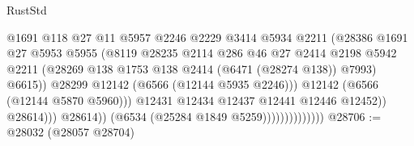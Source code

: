 \begin{lexlean}{RustStd}
\begin{coremodule}
                                              @1691
                                              @118
                                              @27
                                              @11
                                              @5957
                                              @2246
                                              @2229
                                              @3414
                                              @5934
                                              @2211
                                              (@28386
                                                @1691
                                                @27
                                                @5953
                                                @5955
                                                (@8119
                                                  @28235
                                                  @2114
                                                  @286
                                                  @46
                                                  @27
                                                  @2414
                                                  @2198
                                                  @5942
                                                  @2211
                                                  (@28269
                                                    @138
                                                    @1753
                                                    @138
                                                    @2414
                                                    (@6471 (@28274 @138))
                                                    @7993)
                                                  @6615))
                                              @28299
                                              @12142
                                              (@6566 (@12144 @5935 @2246)))
                                            @12142
                                            (@6566 (@12144 @5870 @5960)))
                                          @12431
                                          @12434
                                          @12437
                                          @12441
                                          @12446
                                          @12452))
                                      @28614)))
                                @28614))
                            (@6534 (@25284 @1849 @5259))))))))))))))
@28706 := @28032 (@28057 @28704)

\end{coremodule}
\end{lexlean}
